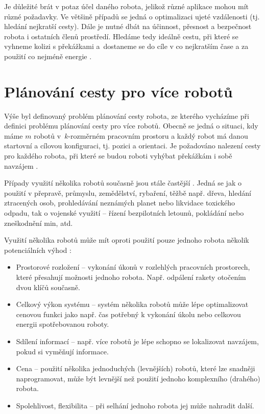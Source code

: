 Je důležité brát v potaz účel daného robota, jelikož různé aplikace mohou mít různé požadavky. Ve většině případů se jedná o optimalizaci ujeté vzdálenosti (tj. hledání nejkratší cesty). Dále je nutné dbát na účinnost, přesnost a bezpečnost robota i ostatních členů prostředí. Hledáme tedy ideálně cestu, při které se vyhneme kolizi s překážkami a~dostaneme se do cíle v co nejkratším čase a za použití co nejméně energie \cite{Koubaa20180406}.



\section{Plánování cesty pro více robotů}\label{sec:multirobotPathPlanning}
Výše byl definovaný problém plánování cesty robota, ze kterého vycházíme při definici problému plánování cesty pro více robotů. Obecně se jedná o situaci, kdy máme $m$ robotů v~$k$-rozměrném pracovním prostoru a každý robot má danou startovní a cílovou konfiguraci, tj. pozici a orientaci. Je požadováno nalezení cesty pro každého robota, při které se budou roboti vyhýbat překážkám i sobě navzájem \cite{Yu20140122}.

Případy využití několika robotů současně jsou stále častější \cite{Dudek1996}. Jedná se jak o použití v přepravě, průmyslu, zemědělství, rybaření, těžbě např. dřeva, hledání ztracených osob, prohledávání neznámých planet nebo likvidace toxického odpadu, tak o vojenské využití -- řízení bezpilotních letounů, pokládání nebo zneškodnění min, atd.

Využití několika robotů může mít oproti použití pouze jednoho robota několik potenciálních výhod \cite{Dudek1996,Yan20130104}:
\begin{itemize}
	\item Prostorové rozložení -- vykonání úkonů v rozlehlých pracovních prostorech, které přesahují možnosti jednoho robota. Např. odpálení rakety otočením dvou klíčů současně.
	\item Celkový výkon systému -- systém několika robotů může lépe optimalizovat cenovou funkci jako např. čas potřebný k vykonání úkolu nebo celkovou energii spotřebovanou roboty.
	\item Sdílení informací -- např. více robotů je lépe schopno se lokalizovat navzájem, pokud si vyměňují informace.
	\item Cena -- použití několika jednoduchých (levnějších) robotů, které lze snadněji naprogramovat, může být levnější než použití jednoho komplexního (drahého) robota.
	\item Spolehlivost, flexibilita -- při selhání jednoho robota jej může nahradit další.
\end{itemize}



